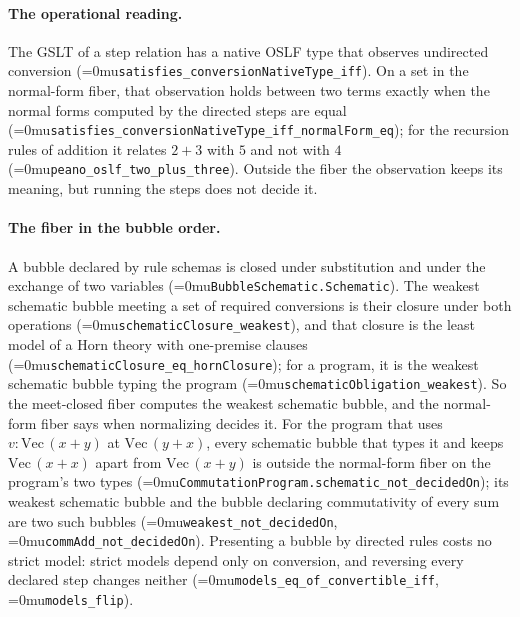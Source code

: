 \documentclass[11pt]{article}
\newcommand{\leanname}[1]{\textup{\Urlmuskip=0mu\relax\nolinkurl{#1}}}
\theoremstyle{definition}
\theoremstyle{remark}
\begin{document}
\paragraph{The operational reading.}
The GSLT of a step relation has a native OSLF type that observes undirected
conversion (\leanname{satisfies_conversionNativeType_iff}). On a set in the
normal-form fiber, that observation holds between two terms exactly when the
normal forms computed by the directed steps are equal
(\leanname{satisfies_conversionNativeType_iff_normalForm_eq}); for the recursion
rules of addition it relates $2+3$ with $5$ and not with $4$
(\leanname{peano_oslf_two_plus_three}). Outside the fiber the observation keeps
its meaning, but running the steps does not decide it.

\paragraph{The fiber in the bubble order.}
A bubble declared by rule schemas is closed under substitution and under the
exchange of two variables (\leanname{BubbleSchematic.Schematic}). The weakest
schematic bubble meeting a set of required conversions is their closure under
both operations (\leanname{schematicClosure_weakest}), and that closure is the
least model of a Horn theory with one-premise clauses
(\leanname{schematicClosure_eq_hornClosure}); for a program, it is the weakest
schematic bubble typing the program (\leanname{schematicObligation_weakest}).
So the meet-closed fiber computes the weakest schematic bubble, and the
normal-form fiber says when normalizing decides it. For the program that uses
$v : \mathrm{Vec}\,(x+y)$ at $\mathrm{Vec}\,(y+x)$, every schematic bubble that
types it and keeps $\mathrm{Vec}\,(x+x)$ apart from $\mathrm{Vec}\,(x+y)$ is
outside the normal-form fiber on the program's two types
(\leanname{CommutationProgram.schematic_not_decidedOn}); its weakest schematic
bubble and the bubble declaring commutativity of every sum are two such bubbles
(\leanname{weakest_not_decidedOn}, \leanname{commAdd_not_decidedOn}).
Presenting a bubble by directed rules costs no strict model: strict models
depend only on conversion, and reversing every declared step changes neither
(\leanname{models_eq_of_convertible_iff}, \leanname{models_flip}).
\end{document}
